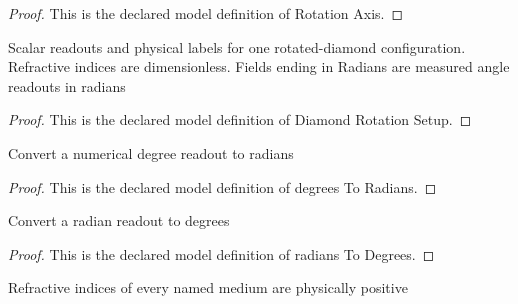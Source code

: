 \begin{proof}
  This is the declared model definition of Rotation Axis.
\end{proof}
\begin{definition}
  \label{def:physics:phyx-mini-0011:phyxminiproblems-problemphyxmini0011-diamondrotationsetup}
  Scalar readouts and physical labels for one rotated-diamond configuration. Refractive indices are dimensionless. Fields ending in Radians are measured angle readouts in radians
\end{definition}
\begin{proof}
  This is the declared model definition of Diamond Rotation Setup.
\end{proof}
\begin{definition}
  \label{def:physics:phyx-mini-0011:phyxminiproblems-problemphyxmini0011-degreestoradians}
  Convert a numerical degree readout to radians
\end{definition}
\begin{proof}
  This is the declared model definition of degrees To Radians.
\end{proof}
\begin{definition}
  \label{def:physics:phyx-mini-0011:phyxminiproblems-problemphyxmini0011-radianstodegrees}
  Convert a radian readout to degrees
\end{definition}
\begin{proof}
  This is the declared model definition of radians To Degrees.
\end{proof}
\begin{definition}
  \label{def:physics:phyx-mini-0011:phyxminiproblems-problemphyxmini0011-haspositiverefractiveindices}
  Refractive indices of every named medium are physically positive
\end{definition}
